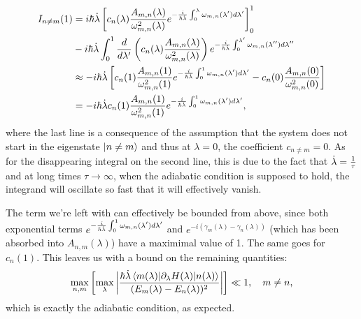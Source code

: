     \begin{equation}\label{eq:final_adiabatic_integral}
        \begin{aligned}
            I_{n \neq m}(1) &= i\hbar \dot{\lambda} \left[ c_n(\lambda) \frac{A_{m,n}(\lambda)}{\omega_{m,n}^2(\lambda)} e^{-\frac{i}{\hbar \dot{\lambda}}\int_0^{\lambda}\omega_{m,n}(\lambda')d \lambda'}  \right]_0^1 \\ 
            &-i\hbar \dot{\lambda} \int_0^1 \frac{d}{d\lambda'} \left(c_n(\lambda) \frac{A_{m,n}(\lambda)}{\omega_{m,n}^2(\lambda)} \right) e^{-\frac{i}{\hbar \dot{\lambda}}\int_0^{\lambda'}\omega_{m,n}(\lambda'')d \lambda''} \\
            &\approx -i\hbar \dot{\lambda} \left[ c_n(1) \frac{A_{m,n}(1)}{\omega_{m,n}^2(1)}e^{-\frac{i}{\hbar \dot{\lambda}}\int_0^{1}\omega_{m,n}(\lambda')d \lambda'} - c_n(0) \frac{A_{m,n}(0)}{\omega_{m,n}^2(0)} \right] \\
            &= -i\hbar \dot{\lambda} c_n(1) \frac{A_{m,n}(1)}{\omega_{m,n}^2(1)}e^{-\frac{i}{\hbar \dot{\lambda}}\int_0^{1}\omega_{m,n}(\lambda')d \lambda'},
        \end{aligned}
    \end{equation}
    where the last line is a consequence of the assumption that the system does not start in the eigenstate $\ket{n \neq m}$ and thus at $\lambda = 0$, the coefficient $c_{n \neq m} = 0$. As for the disappearing integral on the second line, this is due to the fact that $\dot{\lambda} = \frac{1}{\tau}$ and at long times $\tau \rightarrow \infty$, when the adiabatic condition is supposed to hold, the integrand will oscillate so fast that it will effectively vanish\cite{kahane_generalizations_1980}. 

    The term we're left with can effectively be bounded from above, since both exponential terms $e^{-\frac{i}{\hbar \dot{\lambda}}\int_0^{1}\omega_{m,n}(\lambda')d \lambda'}$ and $e^{-i(\gamma_m(\lambda) - \gamma_n(\lambda))}$ (which has been absorbed into $A_{n,m}(\lambda)$) have a maximimal value of 1. The same goes for $c_n(1)$. This leaves us with a bound on the remaining quantities:
    \begin{equation}\label{eq:adiabatic_criterion}
        \max _{n,m}\left[\max_{\lambda} \left| \frac{\hbar \dot{\lambda} \mel{m(\lambda)}{\partial_{\lambda}H(\lambda)}{n(\lambda)}}{(E_m(\lambda) - E_n(\lambda))^2} \right| \right] \ll 1, \quad m \neq n,
    \end{equation}
    which is exactly the adiabatic condition, as expected. 

